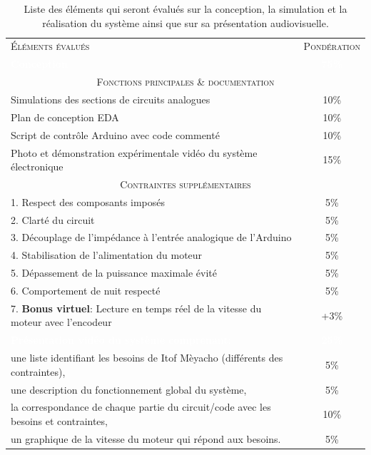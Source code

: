 \documentclass[english,french,12pt]{article}
\begin{document}
\renewcommand{\arraystretch}{1.5}
\begin{table}[h]
\centering
    \begin{tabular}{l c}
    \hline
     \textsc{Éléments évalués} & \textsc{Pondération}\\
     \rowcolor{black} \textcolor{white}{\textbf{Conception}} & \textcolor{white}{\textbf{75\%}}\\
     \multicolumn{2}{c}{\textsc{Fonctions principales \& documentation}}\\
     \hline
     Simulations des sections de circuits analogues & 10\%\\
     Plan de conception EDA & 10\%\\
     Script de contrôle Arduino avec code commenté & 10\%\\
     Photo et démonstration expérimentale vidéo du système électronique & 15\%\\
     \hline
     \multicolumn{2}{c}{\textsc{Contraintes supplémentaires}}\\
     \hline
     1. Respect des composants imposés & 5\%\\
     2. Clarté du circuit & 5\%\\
     3. Découplage de l'impédance à l'entrée analogique de l'Arduino & 5\%\\
     4. Stabilisation de l'alimentation du moteur & 5\%\\
     5. Dépassement de la puissance maximale évité & 5\%\\
     6. Comportement de nuit respecté & 5\%\\
     7. \textbf{Bonus virtuel}: Lecture en temps réel de la vitesse du moteur avec l'encodeur & +3\%\\
     \rowcolor{black} \textcolor{white}{\textbf{Présentation vidéo du système comprenant:}} & \textcolor{white}{\textbf{25\%}}\\
     une liste identifiant les besoins de Itof Mèyacho (différents des contraintes), & 5\%\\
     une description du fonctionnement global du système, & 5\%\\
     la correspondance de chaque partie du circuit/code avec les besoins et contraintes, & 10\%\\
     un graphique de la vitesse du moteur qui répond aux besoins. & 5\%\\
     \hline
    \end{tabular}
\caption{Liste des éléments qui seront évalués sur la conception, la simulation et la réalisation du système ainsi que sur sa présentation audiovisuelle.}
\label{tab:1}
\end{table}
\end{document}
